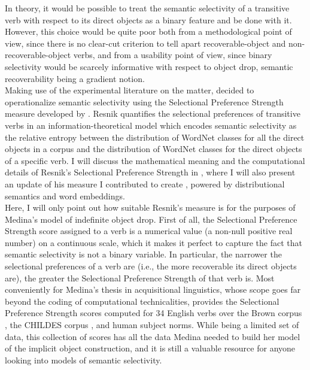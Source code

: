 In theory, it would be possible to treat the semantic selectivity of a transitive verb with respect to its direct objects as a binary feature and be done with it. However, this choice would be quite poor both from a methodological point of view, since there is no clear-cut criterion to tell apart recoverable-object and non-recoverable-object verbs, and from a usability point of view, since binary selectivity would be scarcely informative with respect to object drop, semantic recoverability being a gradient notion.\\
Making use of the experimental literature on the matter, \textcite{Medina2007} decided to operationalize semantic selectivity using the Selectional Preference Strength measure developed by \textcite{Resnik1993, Resnik1996}. Resnik quantifies the selectional preferences of transitive verbs in an information-theoretical model which encodes semantic selectivity as the relative entropy between the distribution of WordNet \parencite{beckwith1991wordnet, Miller1995} classes for all the direct objects in a corpus and the distribution of WordNet classes for the direct objects of a specific verb. I will discuss the mathematical meaning and the computational details of Resnik's Selectional Preference Strength in , where I will also present an update of his measure I contributed to create \parencite{CappelliLenciPISA}, powered by distributional semantics and word embeddings.\\
Here, I will only point out how suitable Resnik's measure is for the purposes of Medina's model of indefinite object drop. First of all, the Selectional Preference Strength score assigned to a verb is a numerical value (a non-null positive real number) on a continuous scale, which it makes it perfect to capture the fact that semantic selectivity is not a binary variable. In particular, the narrower the selectional preferences of a verb are (i.e., the more recoverable its direct objects are), the greater the Selectional Preference Strength of that verb is. Most conveniently for Medina's thesis in acquisitional linguistics, whose scope goes far beyond the coding of computational technicalities, \textcite[150]{Resnik1996} provides the Selectional Preference Strength scores computed for 34 English verbs over the Brown corpus \parencite{kucera1967brownCorpus}, the CHILDES corpus \parencite{macwhinney2000childesCorpus}, and human subject norms. While being a limited set of data, this collection of scores has all the data Medina needed to build her model of the implicit object construction, and it is still a valuable resource for anyone looking into models of semantic selectivity.


